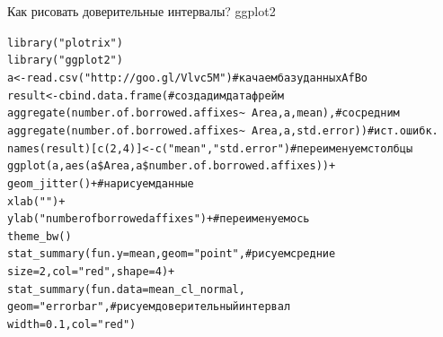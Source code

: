 \begin{frame}{Как рисовать доверительные интервалы? ggplot2}
\scriptsize
\begin{alltt}
library("plotrix")\\
library("ggplot2")\\
a <- read.csv("http://goo.gl/Vlvc5M") \hfill \# качаем базу данных AfBo\\
result <- cbind.data.frame(\hfill \# создадим дата фрейм\\
aggregate(number.of.borrowed.affixes \textasciitilde\ Area, a, mean), \hfill \# со средним\\
                           aggregate(number.of.borrowed.affixes \textasciitilde\ Area, a, std.error)) \hfill \# и ст. ошибк.\\
names(result)[c(2, 4)] <- c("mean"{}, "std.error")\hfill \# переименуем столбцы\medskip\\
ggplot(a, aes(a\$Area, a\$number.of.borrowed.affixes))+\\
  geom\_jitter()+\hfill \# нарисуем данные\\
    xlab("")  +\\
  ylab("number of borrowed affixes")+\hfill \# переименуем ось\\
  theme\_bw()\\
stat\_summary(fun.y = mean, geom = "point"{}, \hfill \# рисуем средние\\
   size = 2, col = "red"{}, shape = 4)+\\
\alert{stat\_summary(fun.data = mean\_cl\_normal, \\
 geom = "errorbar"{}, \hfill \# рисуем доверительный интервал\\
width = 0.1, col = "red")}\\
\end{alltt}
\normalsize
\end{frame}
